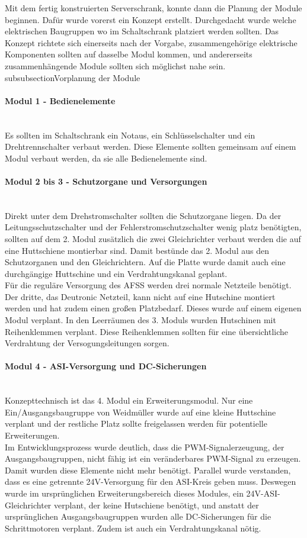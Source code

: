    Mit dem fertig konstruierten Serverschrank, konnte dann die Planung der Module beginnen. Dafür wurde vorerst ein Konzept erstellt. Durchgedacht wurde welche elektrischen Baugruppen wo im Schaltschrank platziert werden sollten. Das Konzept richtete sich einerseits nach der Vorgabe, zusammengehörige elektrische Komponenten sollten auf dasselbe Modul kommen, und andererseits zusammenhängende Module sollten sich möglichst nahe sein. 
\\subsubsection{Vorplanung der Module}
    \paragraph{Modul 1 - Bedienelemente}\mbox{}\\
    Es sollten im Schaltschrank ein Notaus, ein Schlüsselschalter und ein Drehtrennschalter verbaut werden. Diese Elemente sollten gemeinsam auf einem Modul verbaut werden, da sie alle Bedienelemente sind.
    \paragraph{Modul 2 bis 3 - Schutzorgane und Versorgungen}\mbox{}\\
    Direkt unter dem Drehstromschalter sollten die Schutzorgane liegen. Da der Leitungsschutzschalter und der Fehlerstromschutzschalter wenig platz benötigten, sollten auf dem 2. Modul zusätzlich die zwei Gleichrichter verbaut werden die auf eine Huttschiene montierbar sind. Damit bestünde das 2. Modul aus den Schutzorganen und den Gleichrichtern. Auf die Platte wurde damit auch eine durchgängige Huttschine und ein Verdrahtungskanal geplant.\\
    Für die reguläre Versorgung des AFSS werden drei normale Netzteile benötigt. Der dritte, das Deutronic Netzteil, kann nicht auf eine Hutschine montiert werden und hat zudem einen großen Platzbedarf. Dieses wurde auf einem eigenen Modul verplant. In den Leerräumen des 3. Moduls wurden Hutschinen mit Reihenklemmen verplant. Diese Reihenklemmen sollten für eine übersichtliche Verdrahtung der Versogungsleitungen sorgen.
    \paragraph{Modul 4 - ASI-Versorgung und DC-Sicherungen}\mbox{}\\
    Konzepttechnisch ist das 4. Modul ein Erweiterungsmodul. Nur eine Ein/Ausgangsbaugruppe von Weidmüller wurde auf eine kleine Huttschine verplant und der restliche Platz sollte freigelassen werden für potentielle Erweiterungen.\\
    Im Entwicklungsprozess wurde deutlich, dass die PWM-Signalerzeugung, der Ausgangsbaugruppen, nicht fähig ist ein veränderbares PWM-Signal zu erzeugen. Damit wurden diese Elemente nicht mehr benötigt. Parallel wurde verstanden, dass es eine getrennte 24V-Versorgung für den ASI-Kreis geben muss. Deswegen wurde im ursprünglichen Erweiterungsbereich dieses Modules, ein 24V-ASI-Gleichrichter verplant, der keine Hutschiene benötigt, und anstatt der ursprünglichen Ausgangsbaugruppen wurden alle DC-Sicherungen für die Schrittmotoren verplant. Zudem ist auch ein Verdrahtungskanal nötig.
